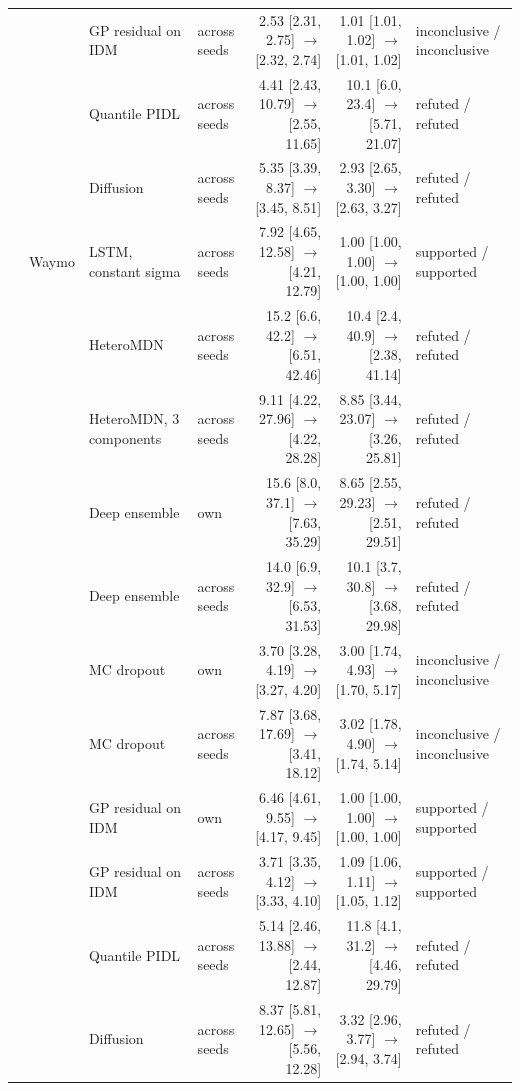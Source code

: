 \begin{longtable}{llllrrl}
 &  & GP residual on IDM & across seeds & 2.53 [2.31, 2.75] $\rightarrow$ [2.32, 2.74] & 1.01 [1.01, 1.02] $\rightarrow$ [1.01, 1.02] & inconclusive / inconclusive \\
 &  & Quantile PIDL & across seeds & 4.41 [2.43, 10.79] $\rightarrow$ [2.55, 11.65] & 10.1 [6.0, 23.4] $\rightarrow$ [5.71, 21.07] & refuted / refuted \\
 &  & Diffusion & across seeds & 5.35 [3.39, 8.37] $\rightarrow$ [3.45, 8.51] & 2.93 [2.65, 3.30] $\rightarrow$ [2.63, 3.27] & refuted / refuted \\
\midrule
 & Waymo & LSTM, constant sigma & across seeds & 7.92 [4.65, 12.58] $\rightarrow$ [4.21, 12.79] & 1.00 [1.00, 1.00] $\rightarrow$ [1.00, 1.00] & supported / supported \\
 &  & HeteroMDN & across seeds & 15.2 [6.6, 42.2] $\rightarrow$ [6.51, 42.46] & 10.4 [2.4, 40.9] $\rightarrow$ [2.38, 41.14] & refuted / refuted \\
 &  & HeteroMDN, 3 components & across seeds & 9.11 [4.22, 27.96] $\rightarrow$ [4.22, 28.28] & 8.85 [3.44, 23.07] $\rightarrow$ [3.26, 25.81] & refuted / refuted \\
 &  & Deep ensemble & own & 15.6 [8.0, 37.1] $\rightarrow$ [7.63, 35.29] & 8.65 [2.55, 29.23] $\rightarrow$ [2.51, 29.51] & refuted / refuted \\
 &  & Deep ensemble & across seeds & 14.0 [6.9, 32.9] $\rightarrow$ [6.53, 31.53] & 10.1 [3.7, 30.8] $\rightarrow$ [3.68, 29.98] & refuted / refuted \\
 &  & MC dropout & own & 3.70 [3.28, 4.19] $\rightarrow$ [3.27, 4.20] & 3.00 [1.74, 4.93] $\rightarrow$ [1.70, 5.17] & inconclusive / inconclusive \\
 &  & MC dropout & across seeds & 7.87 [3.68, 17.69] $\rightarrow$ [3.41, 18.12] & 3.02 [1.78, 4.90] $\rightarrow$ [1.74, 5.14] & inconclusive / inconclusive \\
 &  & GP residual on IDM & own & 6.46 [4.61, 9.55] $\rightarrow$ [4.17, 9.45] & 1.00 [1.00, 1.00] $\rightarrow$ [1.00, 1.00] & supported / supported \\
 &  & GP residual on IDM & across seeds & 3.71 [3.35, 4.12] $\rightarrow$ [3.33, 4.10] & 1.09 [1.06, 1.11] $\rightarrow$ [1.05, 1.12] & supported / supported \\
 &  & Quantile PIDL & across seeds & 5.14 [2.46, 13.88] $\rightarrow$ [2.44, 12.87] & 11.8 [4.1, 31.2] $\rightarrow$ [4.46, 29.79] & refuted / refuted \\
 &  & Diffusion & across seeds & 8.37 [5.81, 12.65] $\rightarrow$ [5.56, 12.28] & 3.32 [2.96, 3.77] $\rightarrow$ [2.94, 3.74] & refuted / refuted \\

\end{longtable}
